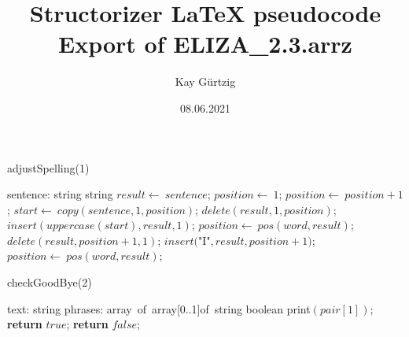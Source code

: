 \documentclass[a4paper,10pt]{article}
\title{Structorizer LaTeX pseudocode Export of ELIZA_2.3.arrz}
\author{Kay Gürtzig}
\date{08.06.2021}
\begin{document}
\begin{algorithm}
\caption{adjustSpelling(1)}
\begin{algorithmic}[5]
\State {}
    \State sentence: string
  \EndDecl
    \State string
  \EndDecl
  \State \(result\gets\ sentence\);
  \State \(position\gets\ 1\);
    \State \(position\gets\ position+1\);
  \EndWhile
    \State \(start\gets\ copy(sentence,1,position)\);
    \State \(delete(result,1,position)\);
    \State \(insert(uppercase(start),result,1)\);
  \EndIf
    \State \(position\gets\ pos(word,result)\);
      \State \(delete(result,position+1,1)\);
      \State \(insert(\)"{}I"{}\(,result,position+1)\);
      \State \(position\gets\ pos(word,result)\);
    \EndWhile
  \EndFor
\EndFunction
\end{algorithmic}
\end{algorithm}


\begin{algorithm}
\caption{checkGoodBye(2)}
\begin{algorithmic}[5]
\State {}
\State {}
\State {}
\State {}
    \State text: string
    \State phrases: array\ of\ array[0..1]of\ string
  \EndDecl
    \State boolean
  \EndDecl
      \State \(\)print\((pair[1])\);
      \State \textbf{return} \(true\);
    \EndIf
  \EndFor
  \State \textbf{return} \(false\);
\EndFunction
\end{algorithmic}
\end{algorithm}
\end{document}
